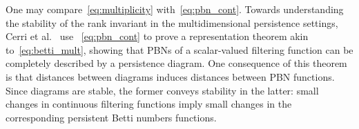 One may compare~\eqref{eq:multiplicity} with~\eqref{eq:pbn_cont}. Towards understanding the stability of the rank invariant in the multidimensional persistence settings, Cerri et al.~\cite{cerri2013betti} use ~\eqref{eq:pbn_cont} to prove a representation theorem akin to~\eqref{eq:betti_mult}, showing that PBNs of a scalar-valued filtering function can be completely described by a persistence diagram. 
One consequence of this theorem is that distances between diagrams induces distances between PBN functions. Since diagrams are stable, the former conveys stability in the latter: small changes in continuous filtering functions imply small changes in the corresponding persistent Betti numbers functions.  





